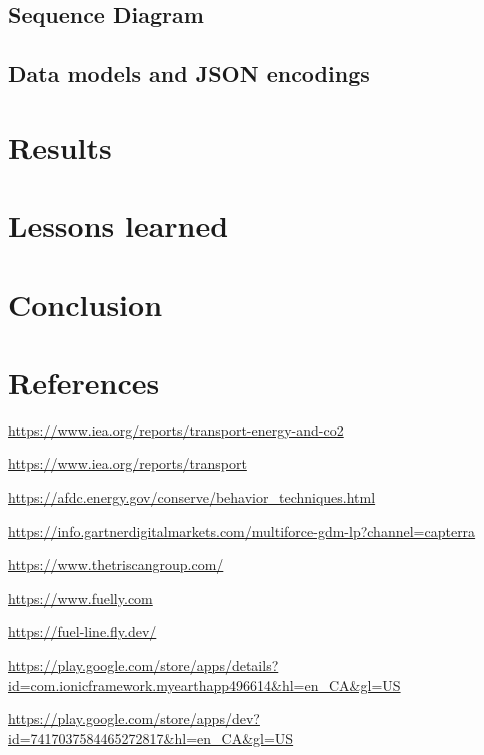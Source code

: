 \documentclass[11pt, oneside]{article}
\begin{document}
\subsection{Sequence Diagram}

\subsection{Data models and JSON encodings}

\section{Results}

\section{Lessons learned}

\section{Conclusion}
 
 
\section{References}

\begin{small}

\noindent [\ref{transport-emissions}] \url{https://www.iea.org/reports/transport-energy-and-co2}

\noindent [\ref{oil-based-transport}] \url{https://www.iea.org/reports/transport}

\noindent [\ref{driving-style}] \url{https://afdc.energy.gov/conserve/behavior_techniques.html}

\noindent [\ref{fuel-force}] \url{https://info.gartnerdigitalmarkets.com/multiforce-gdm-lp?channel=capterra}

\noindent [\ref{triscan}] \url{https://www.thetriscangroup.com/}

\noindent [\ref{fuelly}] \url{https://www.fuelly.com}

\noindent [\ref{fuelline}] \url{https://fuel-line.fly.dev/}

\noindent [\ref{myearth}] \url{https://play.google.com/store/apps/details?id=com.ionicframework.myearthapp496614&hl=en_CA&gl=US}

\noindent [\ref{capture}] \url{https://play.google.com/store/apps/dev?id=7417037584465272817&hl=en_CA&gl=US}



\end{small}
\end{document}
